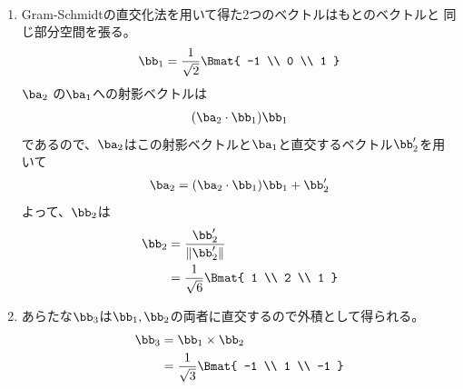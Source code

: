 \begin{ans*}
  ${}$
  \begin{enumerate}[label=(\arabic*)]
    \item Gram-Schmidtの直交化法を用いて得た2つのベクトルはもとのベクトルと
    同じ部分空間を張る。
    \begin{gather}
      \bb_1 = \frac{1}{\sqrt{2}}
      \Bmat{
      -1 \\ 0 \\ 1
      }
    \end{gather}
    $\ba_2$ の$\ba_1$への射影ベクトルは
    \begin{gather}
      (\ba_2\cdot\bb_1)\bb_1
    \end{gather}
    であるので、$\ba_2$はこの射影ベクトルと$\ba_1$と直交するベクトル$\bb'_2$を用いて
    \begin{gather}
      \ba_2 = (\ba_2\cdot\bb_1)\bb_1 + \bb'_2
    \end{gather}
    よって、$\bb_2$は
    \begin{align}
      \bb_2
      &=
      \frac{\bb'_2}{\|\bb'_2\|} \\
      &=
      \frac{1}{\sqrt{6}}
      \Bmat{
        1 \\ 2 \\ 1
      }
    \end{align}
    \item あらたな$\bb_3$は$\bb_1,\bb_2$の両者に直交するので外積として得られる。
    \begin{align}
      \bb_3
      &=
      \bb_1 \times \bb_2 \\
      &=
      \frac{1}{\sqrt{3}}
      \Bmat{
        -1 \\ 1 \\ -1
      }
    \end{align}
  \end{enumerate}
\end{ans*}

